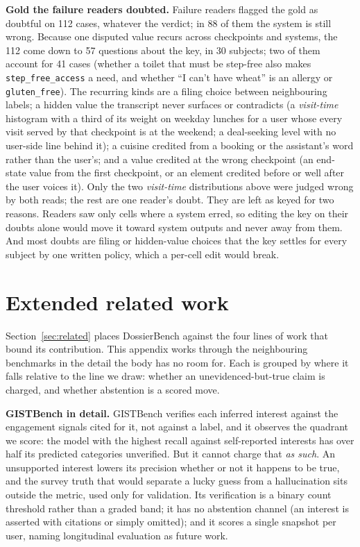 \documentclass{article}
\newcommand{\bench}{DossierBench}
\begin{document}
\textbf{Gold the failure readers doubted.} Failure readers flagged the gold as doubtful on 112 cases,
whatever the verdict; in 88 of them the system is still wrong. Because one disputed value
recurs across checkpoints and systems, the 112 come down to 57 questions about the key, in
30 subjects; two of them account for 41 cases (whether a toilet that must be step-free also
makes \texttt{step\_free\_access} a need, and whether ``I can't have wheat'' is an allergy
or \texttt{gluten\_free}). The recurring kinds are a filing choice between neighbouring
labels; a hidden value the transcript never surfaces or contradicts (a \emph{visit-time}
histogram with a third of its weight on weekday lunches for a user whose every visit served
by that checkpoint is at the weekend; a deal-seeking level with no user-side line behind
it); a cuisine credited from a booking or the assistant's word rather than the user's; and
a value credited at the wrong checkpoint (an end-state value from the first checkpoint, or an
element credited before or well after the user voices it). Only the two \emph{visit-time} distributions above
were judged wrong by both reads; the rest are one reader's doubt. They are left as keyed for
two reasons. Readers saw only cells where a system erred, so editing the key on their doubts
alone would move it toward system outputs and never away from them. And most doubts are
filing or hidden-value choices that the key settles for every subject by one written
policy, which a per-cell edit would break.

\section{Extended related work}
\label{app:relwork}

Section~\ref{sec:related} places \bench{} against the four lines of work that bound its contribution.
This appendix works through the neighbouring benchmarks in the detail the body has no room for. Each
is grouped by where it falls relative to the line we draw: whether an unevidenced-but-true claim is
charged, and whether abstention is a scored move.

\textbf{GISTBench in detail.} GISTBench \citep{fostiropoulos2026gistbench} verifies each inferred
interest against the engagement signals cited for it, not against a label, and it observes the
quadrant we score: the model with the highest recall against self-reported interests has over half
its predicted categories unverified. But it cannot charge that \emph{as such}. An unsupported
interest lowers its precision whether or not it happens to be true, and the survey truth that would
separate a lucky guess from a hallucination sits outside the metric, used only for validation. Its
verification is a binary count threshold rather than a graded band; it has no abstention channel (an
interest is asserted with citations or simply omitted); and it scores a single snapshot per user,
naming longitudinal evaluation as future work.
\end{document}
